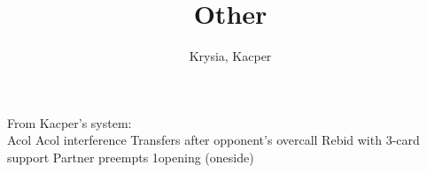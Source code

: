 \documentclass[12pt, a4paper]{article}
\title{Other}
\author{Krysia, Kacper}
\begin{document}
\maketitle


From Kacper's system:\\
Acol
Acol interference
Transfers after opponent's overcall
Rebid with 3-card support
Partner preempts
1\nt opening (oneside)

\end{document}
